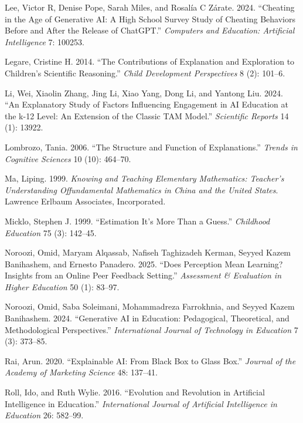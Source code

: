 \documentclass[
  11pt,
]{article}
\newlength{\cslhangindent}
\newenvironment{CSLReferences}[2] %
 {\begin{list}{}{%
  \setlength{\itemindent}{0pt}
  \setlength{\leftmargin}{0pt}
  \setlength{\parsep}{0pt}
  \ifodd #1
   \setlength{\leftmargin}{\cslhangindent}
   \setlength{\itemindent}{-1\cslhangindent}
  \fi
  \setlength{\itemsep}{#2\baselineskip}}}
 {\end{list}}
\begin{document}
\begin{CSLReferences}{1}{0}
Lee, Victor R, Denise Pope, Sarah Miles, and Rosalía C Zárate. 2024. {``Cheating in the Age of Generative AI: A High School Survey Study of Cheating Behaviors Before and After the Release of ChatGPT.''} \emph{Computers and Education: Artificial Intelligence} 7: 100253.

Legare, Cristine H. 2014. {``The Contributions of Explanation and Exploration to Children's Scientific Reasoning.''} \emph{Child Development Perspectives} 8 (2): 101--6.

Li, Wei, Xiaolin Zhang, Jing Li, Xiao Yang, Dong Li, and Yantong Liu. 2024. {``An Explanatory Study of Factors Influencing Engagement in AI Education at the k-12 Level: An Extension of the Classic TAM Model.''} \emph{Scientific Reports} 14 (1): 13922.

Lombrozo, Tania. 2006. {``The Structure and Function of Explanations.''} \emph{Trends in Cognitive Sciences} 10 (10): 464--70.

Ma, Liping. 1999. \emph{Knowing and Teaching Elementary Mathematics: Teacher's Understanding Offundamental Mathematics in China and the United States}. Lawrence Erlbaum Associates, Incorporated.

Micklo, Stephen J. 1999. {``Estimation It's More Than a Guess.''} \emph{Childhood Education} 75 (3): 142--45.

Noroozi, Omid, Maryam Alqassab, Nafiseh Taghizadeh Kerman, Seyyed Kazem Banihashem, and Ernesto Panadero. 2025. {``Does Perception Mean Learning? Insights from an Online Peer Feedback Setting.''} \emph{Assessment \& Evaluation in Higher Education} 50 (1): 83--97.

Noroozi, Omid, Saba Soleimani, Mohammadreza Farrokhnia, and Seyyed Kazem Banihashem. 2024. {``Generative AI in Education: Pedagogical, Theoretical, and Methodological Perspectives.''} \emph{International Journal of Technology in Education} 7 (3): 373--85.

Rai, Arun. 2020. {``Explainable AI: From Black Box to Glass Box.''} \emph{Journal of the Academy of Marketing Science} 48: 137--41.

Roll, Ido, and Ruth Wylie. 2016. {``Evolution and Revolution in Artificial Intelligence in Education.''} \emph{International Journal of Artificial Intelligence in Education} 26: 582--99.


\end{CSLReferences}
\end{document}
